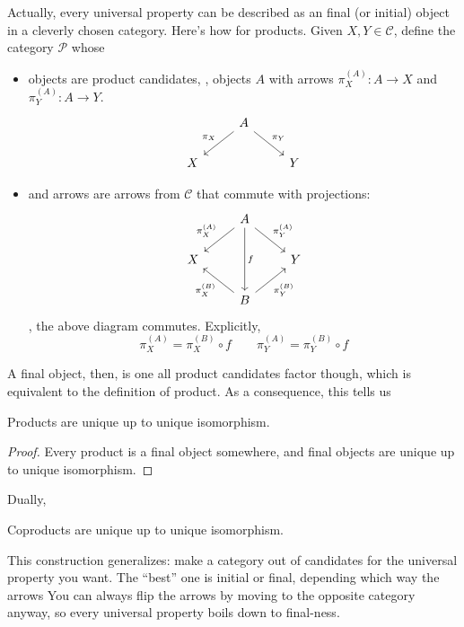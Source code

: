 \documentclass[a5paper]{scrartcl}
\def\cat{\mathcal{C}}
\begin{document}
Actually, every universal property can be described as an final (or initial) object in a cleverly chosen category. Here's how for products. Given \(X,Y \in \cat\), define the category \(\mathcal{P}\) whose
\begin{itemize}
  \item objects are product candidates, \ie, objects \(A\) with arrows \(\pi_X^{(A)} : A \to X\) and \(\pi_Y^{(A)} : A \to Y\).
        \[
        \begin{tikzcd}
          & A\ar[swap,"\pi_X"]{dl} \ar["\pi_Y"]{dr} \\
          X& & Y
        \end{tikzcd}
        \]
  \item and arrows are arrows from \(\cat\) that commute with projections:
        \[
        \begin{tikzcd}
          &A\ar[swap,"\pi_X^{(A)}"]{dl}\ar["\pi_Y^{(A)}"]{dr}\ar["f"]{dd} \\
          X& & Y \\
          &B\ar["\pi_X^{(B)}"]{ul}\ar["\pi_Y^{(B)}",swap]{ur}
        \end{tikzcd}
        \]
        \ie, the above diagram commutes. Explicitly,
        \[
        \pi_X^{(A)} = \pi_X^{(B)} \circ f \qquad
        \pi_Y^{(A)} = \pi_Y^{(B)} \circ f
        \]
\end{itemize}
A final object, then, is one all product candidates factor though, which is equivalent to the definition of product. As a consequence, this tells us
\begin{lemma}
  Products are unique up to unique isomorphism.
\end{lemma}
\begin{proof}
  Every product is a final object somewhere, and final objects are unique up to unique isomorphism.
\end{proof}
Dually,
\begin{cor}
  Coproducts are unique up to unique isomorphism.
\end{cor}

This construction generalizes: make a category out of candidates for the universal property you want. The ``best'' one is initial or final, depending which way the arrows You can always flip the arrows by moving to the opposite category anyway, so every universal property boils down to final-ness.
\end{document}
